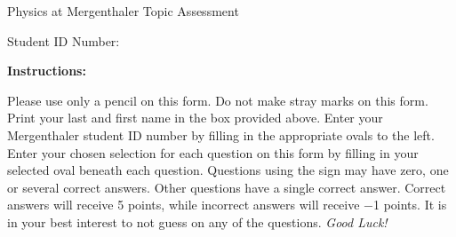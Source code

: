 \documentclass[
    11pt,
]{scrartcl}
\newlength{\mylen}
\begin{document}
\begin{examcopy}[1]

%

\begin{center}
    Physics at Mergenthaler Topic Assessment
\end{center}
\noindent
\begin{minipage}{10.2em}
    \begin{center}
        Student ID Number:
    \end{center}
    \vspace{-0.50em}
\end{minipage}
\setlength{\mylen}{\textwidth}
\addtolength{\mylen}{-10.5em}
\begin{minipage}{\mylen}
    \begin{center}
    \end{center}
    \begin{multicols}{2}
        \begin{center}
            \bfseries Instructions:
        \end{center}
        \vspace{-0.5\baselineskip}
        Please use only a pencil on this form.
        Do not make stray marks on this form.
        Print your last and first name in the box provided above.
        Enter your Mergenthaler student ID number by filling in
            the appropriate ovals to the left.
        Enter your chosen selection for each question on this
            form by filling in your selected oval beneath each question.
        Questions using the sign \multiSymbole{} may have
            zero, one or several correct answers.
        Other questions have a single correct answer.
        Correct answers will receive \num{5} points,
            while incorrect answers will receive \num{-1} points.
        It is in your best interest to not guess on any of the questions.
        \emph{Good Luck!}

\end{multicols}
\end{minipage}
\end{examcopy}
\end{document}
